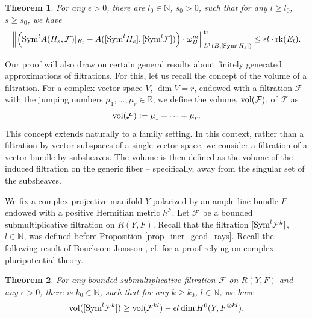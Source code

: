 \documentclass[12pt]{article}
\numberwithin{equation}{section}
\theoremstyle{theorem}
\newtheorem{thm}{Theorem}[section]
\theoremstyle{definition}
\theoremstyle{remark}
\newcommand{\real}{\mathbb{R}}
\newcommand{\nat}{\mathbb{N}}
\newcommand{\rk}[1]{{\rm{rk}} ( #1 )}
\begin{document}
	\begin{thm}\label{thm_rest_weight_l1_comp}
		For any $\epsilon > 0$, there are $l_0 \in \nat$, $s_0 > 0$, such that for any $l \geq l_0$, $s \geq s_0$, we have
		\begin{equation}
			\Big\|  
				\Big( {\rm{Sym}}^l A(H_s, \mathcal{F})|_{E_l}
				-
				A([{\rm{Sym}}^l H_s], [{\rm{Sym}}^l \mathcal{F}]) \Big) \cdot\omega_B^m
			\Big\|_{L^1(B, [{\rm{Sym}}^l H_s ])}^{{\rm{tr}}}
			\leq
			\epsilon l
			\cdot
			\rk{E_l}.
		\end{equation}
	\end{thm}
	\par 
	Our proof will also draw on certain general results about finitely generated approximations of filtrations. 
	For this, let us recall the concept of the volume of a filtration.
	For a complex vector space $V$, $\dim V = r$, endowed with a filtration $\mathcal{F}$ with the jumping numbers $\mu_1, \ldots, \mu_r \in \real$, we define the volume, ${\rm{vol}}(\mathcal{F})$, of $\mathcal{F}$ as
	\begin{equation}
		{\rm{vol}}(\mathcal{F}) := \mu_1 + \cdots + \mu_r.
	\end{equation}
	This concept extends naturally to a family setting. 
	In this context, rather than a filtration by vector subspaces of a single vector space, we consider a filtration of a vector bundle by subsheaves. 
	The volume is then defined as the volume of the induced filtration on the generic fiber -- specifically, away from the singular set of the subsheaves.
	\par 
	We fix a complex projective manifold $Y$ polarized by an ample line bundle $F$ endowed with a positive Hermitian metric $h^F$.
	Let $\mathcal{F}$ be a bounded submultiplicative filtration on $R(Y, F)$.
	Recall that the filtration $[ {\rm{Sym}}^l \mathcal{F}^k ]$, $l \in \nat$, was defined before Proposition \ref{prop_incr_geod_rays}. 
	Recall the following result of Boucksom-Jonsson \cite[Theorem 3.18]{BouckJohn21}, cf. \cite[Proposition 2.8]{FinTits} for a proof relying on complex pluripotential theory.
	\begin{thm}\label{thm_bj_appr}
		For any bounded submultiplicative filtration $\mathcal{F}$ on $R(Y, F)$ and any $\epsilon > 0$, there is $k_0 \in \nat$, such that for any $k \geq k_0$, $l \in \nat$, we have
		\begin{equation}
			{\rm{vol}}([ {\rm{Sym}}^l \mathcal{F}^k ]) \geq {\rm{vol}}(\mathcal{F}^{kl}) - \epsilon l \dim H^0(Y, F^{\otimes kl}).
		\end{equation}
	\end{thm}
	
\end{document}
